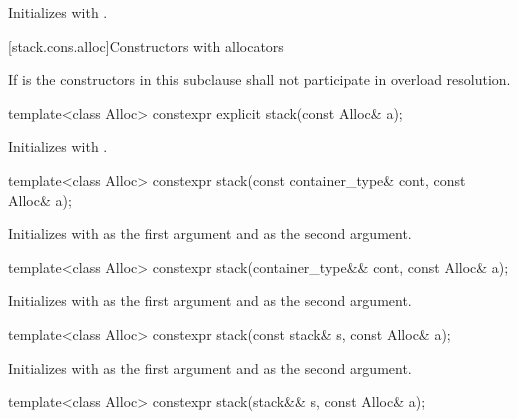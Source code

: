\begin{itemdescr}
\pnum
\effects
Initializes  with .
\end{itemdescr}

[stack.cons.alloc]{Constructors with allocators}

\pnum
If  is 
the constructors in this subclause shall not participate in overload resolution.

%
\begin{itemdecl}
template<class Alloc> constexpr explicit stack(const Alloc& a);
\end{itemdecl}

\begin{itemdescr}
\pnum
\effects
Initializes  with .
\end{itemdescr}

%
\begin{itemdecl}
template<class Alloc> constexpr stack(const container_type& cont, const Alloc& a);
\end{itemdecl}

\begin{itemdescr}
\pnum
\effects
Initializes  with  as the first argument and  as the
second argument.
\end{itemdescr}

%
\begin{itemdecl}
template<class Alloc> constexpr stack(container_type&& cont, const Alloc& a);
\end{itemdecl}

\begin{itemdescr}
\pnum
\effects
Initializes  with  as the first argument and 
as the second argument.
\end{itemdescr}

%
\begin{itemdecl}
template<class Alloc> constexpr stack(const stack& s, const Alloc& a);
\end{itemdecl}

\begin{itemdescr}
\pnum
\effects
Initializes  with  as the first argument and 
as the second argument.
\end{itemdescr}

%
\begin{itemdecl}
template<class Alloc> constexpr stack(stack&& s, const Alloc& a);
\end{itemdecl}

